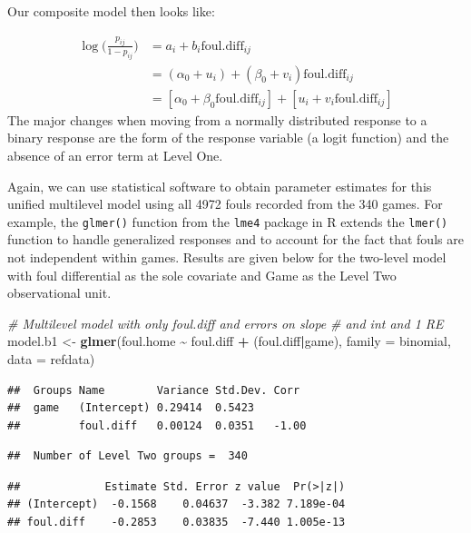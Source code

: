 \documentclass[
]{krantz}
\newenvironment{Shaded}{\begin{snugshade}}{\end{snugshade}}
\newcommand{\AttributeTok}[1]{\textcolor[rgb]{0.27,0.27,0.27}{#1}}
\newcommand{\CommentTok}[1]{\textcolor[rgb]{0.37,0.37,0.37}{\textit{#1}}}
\newcommand{\FunctionTok}[1]{\textcolor[rgb]{0.27,0.27,0.27}{\textbf{#1}}}
\newcommand{\NormalTok}[1]{#1}
\newcommand{\OtherTok}[1]{\textcolor[rgb]{0.37,0.37,0.37}{#1}}
\newcommand{\SpecialCharTok}[1]{\textcolor[rgb]{0.43,0.43,0.43}{\textbf{#1}}}
\begin{document}
Our composite model then looks like:

\begin{align*}
\log\bigg(\frac{p_{ij}}{1-p_{ij}}\bigg) & = a_i+b_i\mathrm{foul.diff}_{ij} \\
 & = (\alpha_{0}+u_i) + (\beta_{0}+v_i)\mathrm{foul.diff}_{ij} \\
 & = [\alpha_{0}+\beta_{0}\mathrm{foul.diff}_{ij}]+[u_i+v_i\mathrm{foul.diff}_{ij}]
\end{align*}
The major changes when moving from a normally distributed response to a binary response are the form of the response variable (a logit function) and the absence of an error term at Level One.

Again, we can use statistical software to obtain parameter estimates for this unified multilevel model using all 4972 fouls recorded from the 340 games. For example, the \texttt{glmer()} function from the \texttt{lme4} package in R extends the \texttt{lmer()} function to handle generalized responses and to account for the fact that fouls are not independent within games. Results are given below for the two-level model with foul differential as the sole covariate and Game as the Level Two observational unit.

\begin{Shaded}
\begin{Highlighting}[]
\CommentTok{\# Multilevel model with only foul.diff and errors on slope }
\CommentTok{\#   and int and 1 RE}
\NormalTok{model.b1 }\OtherTok{\textless{}{-}} \FunctionTok{glmer}\NormalTok{(foul.home }\SpecialCharTok{\textasciitilde{}}\NormalTok{ foul.diff }\SpecialCharTok{+}\NormalTok{ (foul.diff}\SpecialCharTok{|}\NormalTok{game),}
                  \AttributeTok{family =}\NormalTok{ binomial, }\AttributeTok{data =}\NormalTok{ refdata)}
\end{Highlighting}
\end{Shaded}

\begin{verbatim}
##  Groups Name        Variance Std.Dev. Corr 
##  game   (Intercept) 0.29414  0.5423        
##         foul.diff   0.00124  0.0351   -1.00
\end{verbatim}

\begin{verbatim}
##  Number of Level Two groups =  340
\end{verbatim}

\begin{verbatim}
##             Estimate Std. Error z value  Pr(>|z|)
## (Intercept)  -0.1568    0.04637  -3.382 7.189e-04
## foul.diff    -0.2853    0.03835  -7.440 1.005e-13
\end{verbatim}
\end{document}
